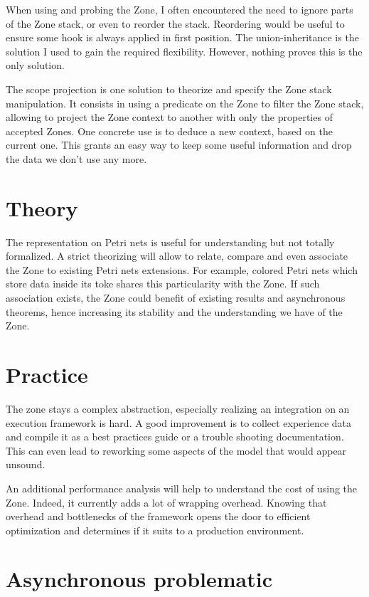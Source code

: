 When using and probing the Zone, I often encountered the need to ignore parts of the Zone stack, or even to reorder the stack. Reordering would be useful to ensure some hook is always applied in first position. The union-inheritance is the solution I used to gain the required flexibility. However, nothing proves this is the only solution. 

The scope projection is one solution to theorize and specify the Zone stack manipulation. It consists in using a predicate on the Zone to filter the Zone stack, allowing to project the Zone context to another with only the properties of accepted Zones. One concrete use is to deduce a new context, based on the current one. This grants an easy way to keep some useful information and drop the data we don't use any more.

\section{Theory}

The representation on Petri nets is useful for understanding but not totally formalized. A strict theorizing will allow to relate, compare and even associate the Zone to existing Petri nets extensions. For example, colored Petri nets which store data inside its toke shares this particularity with the Zone. If such association exists, the Zone could benefit of existing results and asynchronous theorems, hence increasing its stability and the understanding we have of the Zone.

\section{Practice}

The zone stays a complex abstraction, especially realizing an integration on an execution framework is hard. A good improvement is to collect experience data and compile it as a best practices guide or a trouble shooting documentation. This can even lead to reworking some aspects of the model that would appear unsound.

An additional performance analysis will help to understand the cost of using the Zone. Indeed, it currently adds a lot of wrapping overhead. Knowing that overhead and bottlenecks of the framework opens the door to efficient optimization and determines if it suits to a production environment.



\section{Asynchronous problematic}

